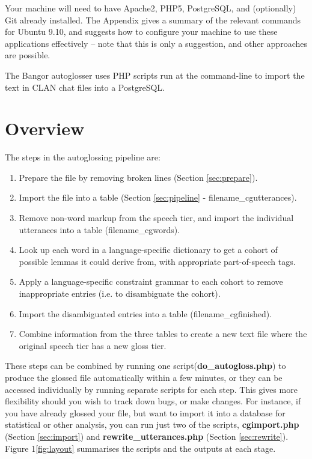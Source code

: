 \documentclass[a4paper,10pt]{article}
\begin{document}
Your machine will need to have Apache2, PHP5, PostgreSQL, and (optionally) Git already installed.  The Appendix gives a summary of the relevant commands for Ubuntu 9.10, and suggests how to configure your machine to use these applications effectively -- note that this is only a suggestion, and other approaches are possible.

The Bangor autoglosser uses PHP scripts run at the command-line to import the text in CLAN chat files into a PostgreSQL.


\section{Overview}
\label{sec:overview}

The steps in the autoglossing pipeline are:
\begin{enumerate}
\item Prepare the file by removing broken lines (Section \ref{sec:prepare}).
\item Import the file into a table (Section \ref{sec:pipeline} - filename\_cgutterances).
\item Remove non-word markup from the speech tier, and import the individual utterances into a table (filename\_cgwords).
\item Look up each word in a language-specific dictionary to get a cohort of possible lemmas it could derive from, with appropriate part-of-speech tags.
\item Apply a language-specific constraint grammar to each cohort to remove inappropriate entries (i.e. to disambiguate the cohort).
\item Import the disambiguated entries into a table (filename\_cgfinished).
\item Combine information from the three tables to create a new text file where the original speech tier has a new gloss tier.
\end{enumerate}

These steps can be combined by running one script(\textbf{do\_autogloss.php}) to produce the glossed file automatically within a few minutes, or they can be accessed individually by running separate scripts for each step.  This gives more flexibility should you wish to track down bugs, or make changes.  For instance, if you have already glossed your file, but want to import it into a database for statistical or other analysis, you can run just two of the scripts, \textbf{cgimport.php} (Section \ref{sec:import}) and \textbf{rewrite\_utterances.php} (Section \ref{sec:rewrite}).  Figure 1\ref{fig:layout} summarises the scripts and the outputs at each stage.
\end{document}
